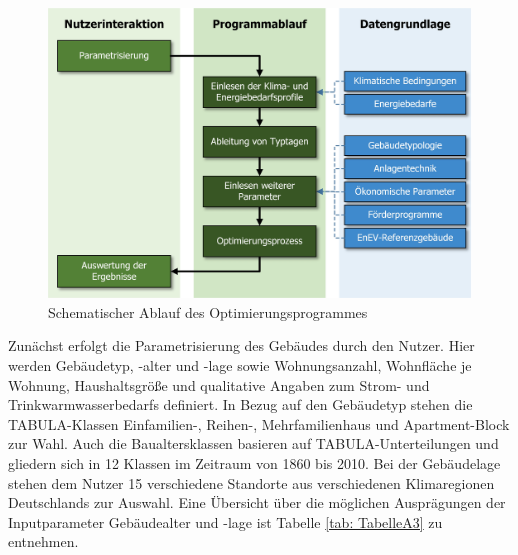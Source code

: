 \begin{figure}[H]
	\centering
		\includegraphics{Pictures/ProzessOptiProgramm.jpg}
	\caption{Schematischer Ablauf des Optimierungsprogrammes}
	\label{fig: Abbildung321} 
\end{figure}

Zunächst erfolgt die Parametrisierung des Gebäudes durch den Nutzer.
Hier werden Gebäudetyp, -alter und -lage sowie Wohnungsanzahl, Wohnfläche je Wohnung, Haushaltsgröße und qualitative Angaben zum Strom- und Trinkwarmwasserbedarfs definiert.
In Bezug auf den Gebäudetyp stehen die TABULA-Klassen Einfamilien-, Reihen-, Mehrfamilienhaus und Apartment-Block zur Wahl.
Auch die Baualtersklassen basieren auf TABULA-Unterteilungen und gliedern sich in 12 Klassen im Zeitraum von 1860 bis 2010.
Bei der Gebäudelage stehen dem Nutzer 15 verschiedene Standorte aus verschiedenen Klimaregionen Deutschlands zur Auswahl.
Eine Übersicht über die möglichen Ausprägungen der Inputparameter Gebäudealter und -lage ist Tabelle \ref{tab: TabelleA3} zu entnehmen. \cite{Loga.102012}

